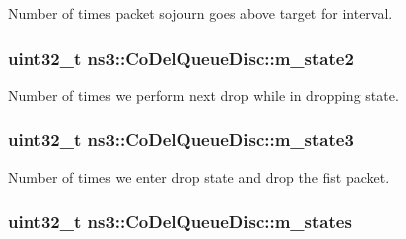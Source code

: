 Number of times packet sojourn goes above target for interval. 

\subsubsection[{\texorpdfstring{m\+\_\+state2}{m_state2}}]{\setlength{\rightskip}{0pt plus 5cm}uint32\+\_\+t ns3\+::\+Co\+Del\+Queue\+Disc\+::m\+\_\+state2\hspace{0.3cm}{\ttfamily [private]}}\hypertarget{classns3_1_1CoDelQueueDisc_afbccfc67434a2b3767ef21fb33beeb86}{}\label{classns3_1_1CoDelQueueDisc_afbccfc67434a2b3767ef21fb33beeb86}


Number of times we perform next drop while in dropping state. 

\subsubsection[{\texorpdfstring{m\+\_\+state3}{m_state3}}]{\setlength{\rightskip}{0pt plus 5cm}uint32\+\_\+t ns3\+::\+Co\+Del\+Queue\+Disc\+::m\+\_\+state3\hspace{0.3cm}{\ttfamily [private]}}\hypertarget{classns3_1_1CoDelQueueDisc_a2d42fc65424271f253f395283ed0ee2d}{}\label{classns3_1_1CoDelQueueDisc_a2d42fc65424271f253f395283ed0ee2d}


Number of times we enter drop state and drop the fist packet. 

\subsubsection[{\texorpdfstring{m\+\_\+states}{m_states}}]{\setlength{\rightskip}{0pt plus 5cm}uint32\+\_\+t ns3\+::\+Co\+Del\+Queue\+Disc\+::m\+\_\+states\hspace{0.3cm}{\ttfamily [private]}}\hypertarget{classns3_1_1CoDelQueueDisc_a9354ec02c9da7af518fba50f067d0648}{}\label{classns3_1_1CoDelQueueDisc_a9354ec02c9da7af518fba50f067d0648}


